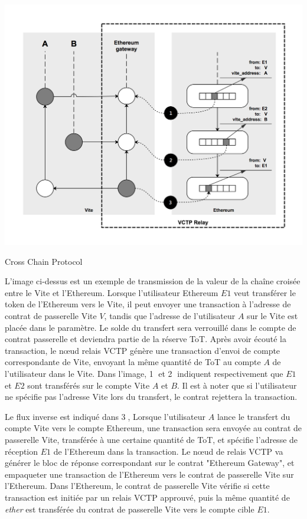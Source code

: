 \documentclass[UTF8,nofonts]{article}
\makeatletter
\newenvironment{figurehere}
 {\def\@captype{figure}}
 {}
\makeatother
\begin{document}
\begin{multicols}{2}
\begin{center}
\begin{figurehere}
\includegraphics[width=\linewidth]{image/crosschain.png}
\caption{Cross Chain Protocol}
\end{figurehere}
\end{center}

L'image ci-dessus est un exemple de transmission de la valeur de la chaîne croisée entre le Vite et l'Ethereum. Lorsque l'utilisateur Ethereum $E1$ veut transférer le token de l'Ethereum vers le Vite, il peut envoyer une transaction à l'adresse de contrat de passerelle Vite $V$, tandis que l'adresse de l'utilisateur $A$ sur le Vite est placée dans le paramètre. Le solde du transfert sera verrouillé dans le compte de contrat passerelle et deviendra partie de la réserve ToT. Après avoir écouté la transaction, le nœud relais VCTP génère une transaction d'envoi de compte correspondante de Vite, envoyant la même quantité de ToT au compte $A$ de l'utilisateur dans le Vite. Dans l'image, \textcircled{1} et \textcircled{2} indiquent respectivement que $E1$ et $E2$ sont transférés sur le compte Vite $A$ et $B$. Il est à noter que si l'utilisateur ne spécifie pas l'adresse Vite lors du transfert, le contrat rejettera la transaction.

Le flux inverse est indiqué dans \textcircled{3}, Lorsque l'utilisateur $A$ lance le transfert du compte Vite vers le compte Ethereum, une transaction sera envoyée au contrat de passerelle Vite, transférée à une certaine quantité de ToT, et spécifie l'adresse de réception $E1$ de l'Ethereum dans la transaction. Le nœud de relais VCTP va générer le bloc de réponse correspondant sur le contrat "Ethereum Gateway", et empaqueter une transaction de l'Ethereum vers le contrat de passerelle Vite sur l'Ethereum. Dans l'Ethereum, le contrat de passerelle Vite vérifie si cette transaction est initiée par un relais VCTP approuvé, puis la même quantité de \textit{ether} est transférée du contrat de passerelle Vite vers le compte cible $E1$.


\end{multicols}
\end{document}
